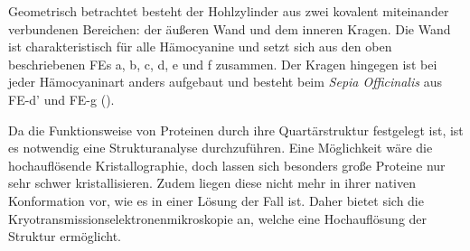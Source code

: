 Geometrisch betrachtet besteht der Hohlzylinder aus zwei kovalent miteinander verbundenen Bereichen: der äußeren Wand und dem inneren Kragen.
Die Wand ist charakteristisch für alle Hämocyanine und setzt sich aus den oben beschriebenen FEs a, b, c, d, e und f zusammen.
Der Kragen hingegen ist bei jeder Hämocyaninart anders aufgebaut und besteht beim \textit{Sepia Officinalis} aus FE-d' und FE-g (\cite{julian_haemo}).

Da die Funktionsweise von Proteinen durch ihre Quartärstruktur festgelegt ist, ist es notwendig eine Strukturanalyse durchzuführen.
Eine Möglichkeit wäre die hochauflösende Kristallographie, doch lassen sich besonders große Proteine nur sehr schwer kristallisieren.
Zudem liegen diese nicht mehr in ihrer nativen Konformation vor, wie es in einer Lösung der Fall ist.
Daher bietet sich die Kryotransmissionselektronenmikroskopie an, welche eine Hochauflösung der Struktur ermöglicht.

\FloatBarrier